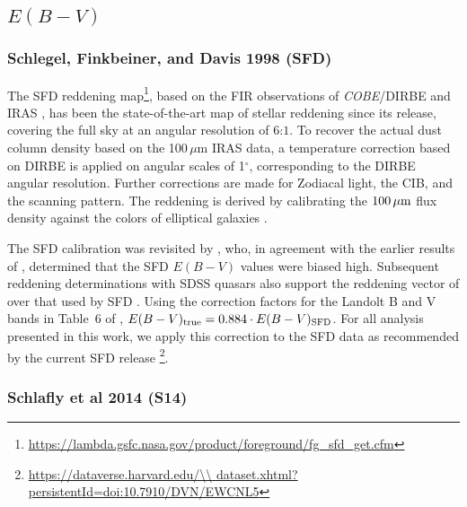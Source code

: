 \documentclass[iop,apj]{emulateapj}
\begin{document}
\subsection{$E(B-V)$}
\subsubsection{Schlegel, Finkbeiner, and Davis 1998 (SFD)}

The SFD reddening map\footnote{\url{https://lambda.gsfc.nasa.gov/product/foreground/fg\_sfd\_get.cfm}}, based on the FIR observations of \textit{COBE}/DIRBE and IRAS \citep{Silverberg+etal_1993, Neugebauer+etal_1984}, has been the state-of-the-art map of stellar reddening since its release, covering the full sky at an angular resolution of $6\overset{'}{.}1$. To recover the actual dust column density based on the 100\,$\mu$m IRAS data, a temperature correction based on DIRBE is applied on angular scales of 1$^\circ$, corresponding to the DIRBE angular resolution. Further corrections are made for Zodiacal light, the CIB, and the scanning pattern. The reddening is derived by calibrating the $100\,\rm\mu m$ flux density against the colors of elliptical galaxies \citep{Postman+Lauer_1995}.

The SFD calibration was revisited by \citet{Schlafly+Finkbeiner_2011}, who, in agreement with the earlier results of \citet{Schlafly+etal_2010}, determined that the SFD $E(B-V)$ values were biased high. Subsequent reddening determinations with SDSS quasars also support the reddening vector of \citet{Schlafly+Finkbeiner_2011} over that used by SFD \citep{Wolf_2014}. Using the correction factors for the Landolt B and V bands in Table~6 of \citet{Schlafly+Finkbeiner_2011}, $E(B-V)_{\rm true} = 0.884\cdot E(B-V)_{\rm SFD}$. For all analysis presented in this work, we apply this correction to the SFD data as recommended by the current SFD release \citep{SFD_data} \footnote{\url{https://dataverse.harvard.edu/\\ dataset.xhtml?persistentId=doi:10.7910/DVN/EWCNL5}}.

\subsubsection{Schlafly et al 2014 (S14)}
\end{document}
